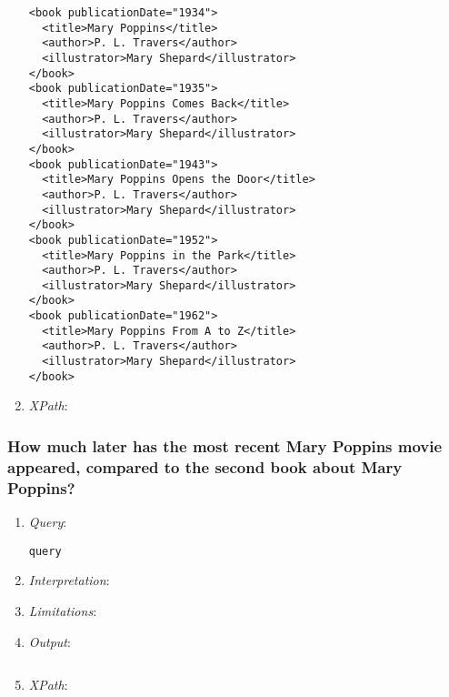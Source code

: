 \documentclass[11pt]{article}
\begin{document}
\begin{enumerate}
\begin{verbatim}
<book publicationDate="1934">
  <title>Mary Poppins</title>
  <author>P. L. Travers</author>
  <illustrator>Mary Shepard</illustrator>
</book>
<book publicationDate="1935">
  <title>Mary Poppins Comes Back</title>
  <author>P. L. Travers</author>
  <illustrator>Mary Shepard</illustrator>
</book>
<book publicationDate="1943">
  <title>Mary Poppins Opens the Door</title>
  <author>P. L. Travers</author>
  <illustrator>Mary Shepard</illustrator>
</book>
<book publicationDate="1952">
  <title>Mary Poppins in the Park</title>
  <author>P. L. Travers</author>
  <illustrator>Mary Shepard</illustrator>
</book>
<book publicationDate="1962">
  <title>Mary Poppins From A to Z</title>
  <author>P. L. Travers</author>
  <illustrator>Mary Shepard</illustrator>
</book>
\end{verbatim} 
\item \textit{XPath}:
\end{enumerate}

\subsubsection{How much later has the most recent Mary Poppins movie appeared, compared to the second book about Mary Poppins?}

\begin{enumerate}
\item \textit{Query}:
\begin{small}
\begin{verbatim}
query
\end{verbatim}
\end{small}
\item \textit{Interpretation}:
\item \textit{Limitations}: 
\item \textit{Output}:
\begin{verbatim}
\end{verbatim} 
\item \textit{XPath}:
\end{enumerate}
\end{document}

